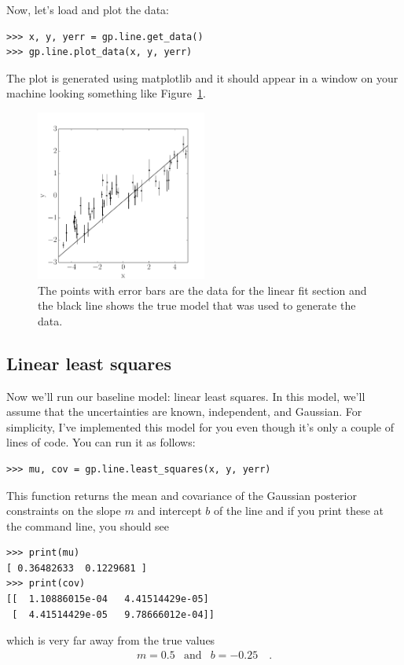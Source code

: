 \documentclass[12pt,preprint]{aastex}
\newcommand{\project}[1]{{\sffamily #1}}
\newcommand{\Fig}[1]{Figure~\ref{fig:#1}}
\newcommand{\fig}[1]{\Fig{#1}}
\newcommand{\figlabel}[1]{\label{fig:#1}}
\begin{document}
Now, let's load and plot the data:
\begin{lstlisting}
>>> x, y, yerr = gp.line.get_data()
>>> gp.line.plot_data(x, y, yerr)
\end{lstlisting}
The plot is generated using \project{matplotlib} and it should appear in a
window on your machine looking something like \fig{line-data}.

\begin{figure}[htbp]
\begin{center}
\includegraphics[width=0.5\textwidth]{figures/line_data.pdf}
\end{center}
\caption{%
The points with error bars are the data for the linear fit section and the
black line shows the true model that was used to generate the data.
\figlabel{line-data}}
\end{figure}

\subsection{Linear least squares}

Now we'll run our baseline model: linear least squares.
In this model, we'll assume that the uncertainties are known, independent, and
Gaussian.
For simplicity, I've implemented this model for you even though it's only a
couple of lines of code.
You can run it as follows:
\begin{lstlisting}
>>> mu, cov = gp.line.least_squares(x, y, yerr)
\end{lstlisting}
This function returns the mean and covariance of the Gaussian posterior
constraints on the slope $m$ and intercept $b$ of the line and if you print
these at the command line, you should see
\begin{lstlisting}
>>> print(mu)
[ 0.36482633  0.1229681 ]
>>> print(cov)
[[  1.10886015e-04   4.41514429e-05]
 [  4.41514429e-05   9.78666012e-04]]
\end{lstlisting}
which is very far away from the true values
\begin{eqnarray}
m = 0.5 &\mathrm{and}& b = -0.25 \quad.
\end{eqnarray}
\end{document}
